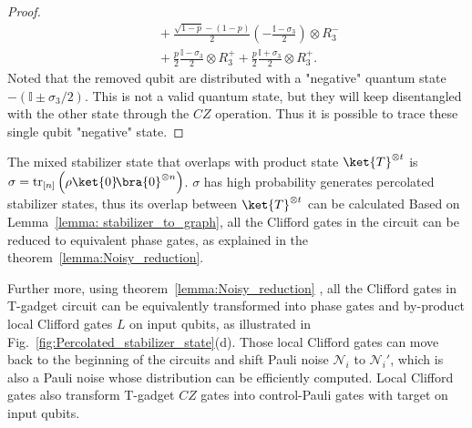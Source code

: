 \documentclass[aps,%
twocolumn,%
floatfix,%
pra,%
amsfonts,%
longbibliography,%
groupedaddress,%
superscriptaddress]{revtex4-2}%
\newcommand{\1}{\mathbbm{1}}
\begin{document}
\begin{proof}
\begin{align}
    &\quad + \frac{ \sqrt{1 - p} -(1-p) }{2}\left(-\frac{\mathbb{I} - \sigma_3 }{2}\right) \otimes {R_3^-}\\
    & \quad +\frac{p}{2}\frac{\mathbb{I} - \sigma_3}{2}\otimes  R_3^+ +\frac{p}{2}\frac{\mathbb{I} + \sigma_3}{2}\otimes  R_3^+.
\end{align}
Noted that the removed qubit are distributed with a "negative" quantum state $-\left({\mathbb{I} \pm \sigma_3 }/{2}\right)$. This is not a valid quantum state, but they will keep disentangled with the other state through the $CZ$ operation. Thus it is possible to trace these single qubit "negative" state.  
\end{proof}


The mixed stabilizer state that overlaps with product state $\ket{T}^{\otimes t}$ is $\sigma = \text{tr}_{[n]} \left( \rho \ket{0}\!\bra{0}^{\otimes n}\right)$. 
$\sigma$ has high probability generates percolated stabilizer states, thus its overlap between $\ket{T}^{\otimes t}$ can be calculated Based on Lemma~\ref{lemma: stabilizer_to_graph}, all the Clifford gates in the circuit can be reduced to equivalent phase gates, as explained in the theorem~\ref{lemma:Noisy_reduction}.

Further more, using theorem~\ref{lemma:Noisy_reduction} , all the Clifford gates in T-gadget circuit can be equivalently transformed into phase gates and by-product local Clifford gates $L$ on input qubits, as illustrated in Fig.~\ref{fig:Percolated_stabilizer_state}(d). Those local Clifford gates can move back to the beginning of the circuits and shift Pauli noise $\mathcal{N}_i$ to $\mathcal{N}_{i}'$, which is also a Pauli noise whose distribution can be efficiently computed. Local Clifford gates also transform T-gadget $CZ$ gates into control-Pauli gates with target on input qubits. 
\end{document}
